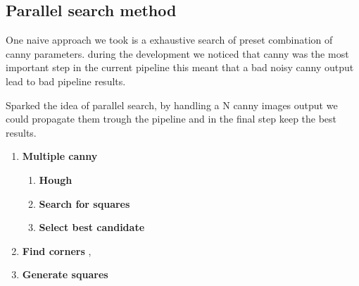 

\subsection{Parallel search method}
One naive approach we took is a exhaustive search of preset combination of canny parameters. during the development we noticed that canny was the most important step in the current pipeline
this meant that a bad noisy canny output lead to bad pipeline results.


Sparked the idea of parallel search, by handling a N canny images output we could propagate them trough the pipeline and in the final step keep the best results.

\begin{enumerate}
    \item 
    {
        \textbf{Multiple canny}    
    }
    {
        \begin{enumerate}
            \item 
            {
                \textbf{Hough}
            }
            \item 
            {
                \textbf{Search for squares}
            }
            \item 
            {
                \textbf{Select best candidate}
            }
        \end{enumerate}
    }
    \item 
    {
        \textbf{Find corners}
    },
    \item 
    {
        \textbf{Generate squares}
    }
\end{enumerate}



